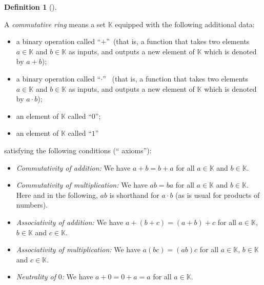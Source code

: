 \documentclass[numbers=enddot,12pt,final,onecolumn,notitlepage]{scrartcl}%
\theoremstyle{definition}
\newtheorem{defi}[theo]{Definition}
\newenvironment{definition}[1][]
{\begin{defi}[#1]\begin{leftbar}}
{\end{leftbar}\end{defi}}
\begin{document}
\begin{definition}
\label{def.commring}A \textit{commutative ring} means a set $\mathbb{K}$
equipped with the following additional data:

\begin{itemize}
\item a binary operation called \textquotedblleft$+$\textquotedblright\ (that
is, a function that takes two elements $a\in\mathbb{K}$ and $b\in\mathbb{K}$
as inputs, and outputs a new element of $\mathbb{K}$ which is denoted by $a+b$);

\item a binary operation called \textquotedblleft$\cdot$\textquotedblright%
\ (that is, a function that takes two elements $a\in\mathbb{K}$ and
$b\in\mathbb{K}$ as inputs, and outputs a new element of $\mathbb{K}$ which is
denoted by $a\cdot b$);

\item an element of $\mathbb{K}$ called \textquotedblleft$0$\textquotedblright;

\item an element of $\mathbb{K}$ called \textquotedblleft$1$\textquotedblright
\end{itemize}

satisfying the following conditions (\textquotedblleft
axioms\textquotedblright):

\begin{itemize}
\item \textit{Commutativity of addition:} We have $a+b=b+a$ for all
$a\in\mathbb{K}$ and $b\in\mathbb{K}$.

\item \textit{Commutativity of multiplication:} We have $ab=ba$ for all
$a\in\mathbb{K}$ and $b\in\mathbb{K}$. Here and in the following, $ab$ is
shorthand for $a\cdot b$ (as is usual for products of numbers).

\item \textit{Associativity of addition:} We have $a+\left(  b+c\right)
=\left(  a+b\right)  +c$ for all $a\in\mathbb{K}$, $b\in\mathbb{K}$ and
$c\in\mathbb{K}$.

\item \textit{Associativity of multiplication:} We have $a\left(  bc\right)
=\left(  ab\right)  c$ for all $a\in\mathbb{K}$, $b\in\mathbb{K}$ and
$c\in\mathbb{K}$.

\item \textit{Neutrality of }$0$\textit{:} We have $a+0=0+a=a$ for all
$a\in\mathbb{K}$.


\end{itemize}
\end{definition}
\end{document}
